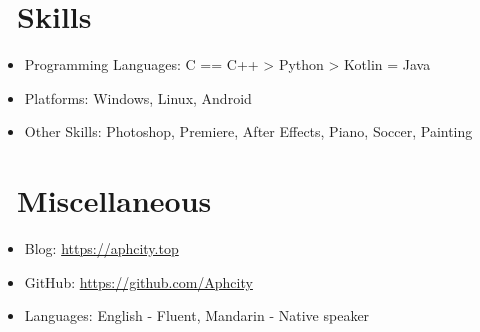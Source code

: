 \documentclass[12pt]{resume}
\begin{document}
\section{\texorpdfstring{\textbf{}\ Skills}{Skills}}
\begin{itemize}[parsep=0.5ex]
  \item Programming Languages: C == C++ > Python > Kotlin = Java
  \item Platforms: Windows, Linux, Android
  \item Other Skills: Photoshop, Premiere, After Effects, Piano, Soccer, Painting
\end{itemize}

\section{\texorpdfstring{\textbf{}\ Miscellaneous}{Miscellaneous}}
\begin{itemize}[parsep=0.5ex]
  \item Blog: \url{https://aphcity.top}
  \item GitHub: \url{https://github.com/Aphcity}
  \item Languages: English - Fluent, Mandarin - Native speaker
\end{itemize}

%
%
\end{document}
